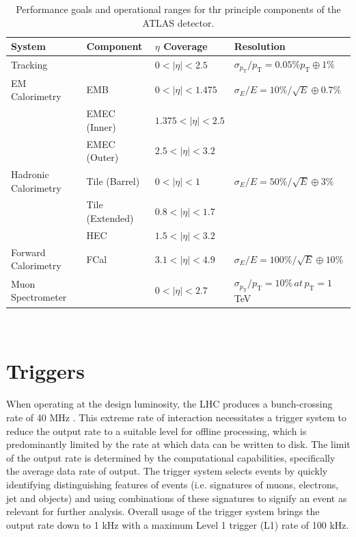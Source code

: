 	  	\begin{table}[ht]
	  		\caption{Performance goals and operational ranges for thr principle components of the ATLAS detector. \cite{ATLAS}}
	  		\label{tab:d:operational}
	  		\medskip
	  		\centering
	  		\begin{tabular}{llll}\toprule
	  			System & Component & $\eta$ Coverage & Resolution \\\midrule
	  			Tracking &  & $0<|\eta|<2.5$ & $\sigma_{p_\text{T}}/p_\text{T} = 0.05\% p_\text{T}\oplus1\%$\\
	  			EM Calorimetry & EMB & $0<|\eta|<1.475$ & $\sigma_{E}/E = 10\%/\sqrt{E} \oplus0.7\%$ \\
	  			& EMEC (Inner) & $1.375<|\eta|<2.5$ &  \\
	  			& EMEC (Outer) & $2.5<|\eta|<3.2$ &  \\
	  			Hadronic Calorimetry & Tile (Barrel) & $0<|\eta|<1$ & $\sigma_{E}/E = 50\%/\sqrt{E} \oplus3\%$ \\
	  			& Tile (Extended) & $0.8<|\eta|<1.7$ &  \\
	  			 & HEC & $1.5<|\eta|<3.2$ &  \\
	  			Forward Calorimetry & FCal & $3.1<|\eta|<4.9$ & $\sigma_{E}/E = 100\%/\sqrt{E} \oplus10\%$ \\
	  			Muon Spectrometer &  &  $0<|\eta|<2.7$  & $\sigma_{p_\text{T}}/p_\text{T} = 10\%\,at\,p_\text{T}=1$ TeV  \\\bottomrule
	  		\end{tabular}\\[5pt]
	  	\end{table}

\section{Triggers}

	When operating at the design luminosity, the LHC produces a bunch-crossing rate of 40 MHz \cite{trigrun2017}. This extreme rate of interaction necessitates a trigger system to reduce the output rate to a suitable level for offline processing, which is predominantly limited by the rate at which data can be written to disk. The limit of the output rate is determined by the computational capabilities, specifically the average data rate of output. The trigger system selects events by quickly identifying distinguishing features of events (i.e. signatures of muons, electrons, jet and \bjet objects) and using combinations of these signatures to signify an event as relevant for further analysis. Overall usage of the trigger system brings the output rate down to 1 kHz with a maximum Level 1 trigger (L1) rate of 100 kHz.

